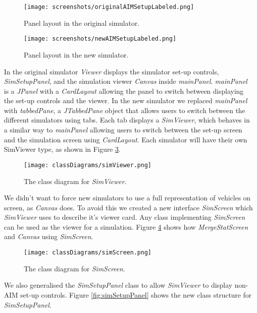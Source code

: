 \begin{figure}[htb]
\texttt{[image: screenshots/originalAIMSetupLabeled.png]}
\caption{Panel layout in the original simulator.}
\label{fig:originalAIMSetupLabeled}
\end{figure}

\begin{figure}[htb]
\texttt{[image: screenshots/newAIMSetupLabeled.png]}
\caption{Panel layout in the new simulator.}
\label{fig:newAIMSetupLabeled}
\end{figure}

In the original simulator \emph{Viewer} displays the simulator set-up controls, \emph{SimSetupPanel}, and the simulation viewer \emph{Canvas} inside \emph{mainPanel}. \emph{mainPanel} is a \emph{JPanel} with a \emph{CardLayout} allowing the panel to switch between displaying the set-up controls and the viewer. In the new simulator we replaced \emph{mainPanel} with \emph{tabbedPane}, a \emph{JTabbedPane} object that allows users to switch between the different simulators using tabs. Each tab displays a \emph{SimViewer}, which behaves in a similar way to \emph{mainPanel} allowing users to switch between the set-up screen and the simulation screen using \emph{CardLayout}. Each simulator will have their own SimViewer type, as shown in Figure \ref{fig:simViewer}.

\begin{figure}[htb]
\texttt{[image: classDiagrams/simViewer.png]}
\caption{The class diagram for \emph{SimViewer}.}
\label{fig:simViewer}
\end{figure}

We didn't want to force new simulators to use a full representation of vehicles on screen, as \emph{Canvas} does. To avoid this we created a new interface \emph{SimScreen} which \emph{SimViewer} uses to describe it's viewer card. Any class implementing \emph{SimScreen} can be used as the viewer for a simulation. Figure \ref{fig:simScreen} shows how \emph{MergeStatScreen} and \emph{Canvas} using \emph{SimScreen}.

\begin{figure}[htb]
\texttt{[image: classDiagrams/simScreen.png]}
\caption{The class diagram for \emph{SimScreen}.}
\label{fig:simScreen}
\end{figure}

We also generalised the \emph{SimSetupPanel} class to allow \emph{SimViewer} to display non-AIM set-up controls. Figure \ref{fig:simSetupPanel} shows the new class structure for \emph{SimSetupPanel}.

